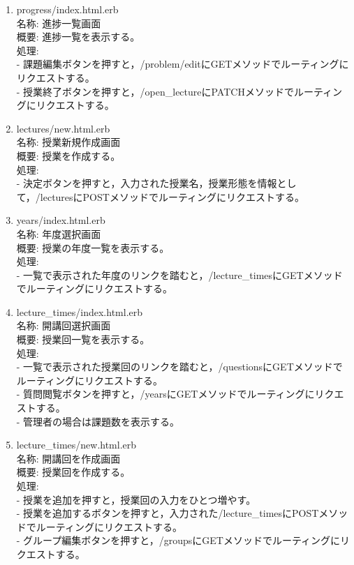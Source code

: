 \begin{enumerate}
\item progress/index.html.erb\\
名称:
進捗一覧画面\\
概要:
進捗一覧を表示する。\\
処理:\\
- 課題編集ボタンを押すと，/problem/editにGETメソッドでルーティングにリクエストする。\\
- 授業終了ボタンを押すと，/open\_lectureにPATCHメソッドでルーティングにリクエストする。

\item lectures/new.html.erb\\
名称:
授業新規作成画面\\
概要:
授業を作成する。\\
処理:\\
- 決定ボタンを押すと，入力された授業名，授業形態を情報として，/lecturesにPOSTメソッドでルーティングにリクエストする。

\item years/index.html.erb\\
名称:
年度選択画面\\
概要:
授業の年度一覧を表示する。\\
処理:\\
- 一覧で表示された年度のリンクを踏むと，/lecture\_timesにGETメソッドでルーティングにリクエストする。

\item lecture\_times/index.html.erb\\
名称:
開講回選択画面\\
概要:
授業回一覧を表示する。\\
処理:\\
- 一覧で表示された授業回のリンクを踏むと，/questionsにGETメソッドでルーティングにリクエストする。\\
- 質問閲覧ボタンを押すと，/yearsにGETメソッドでルーティングにリクエストする。\\
- 管理者の場合は課題数を表示する。

\item lecture\_times/new.html.erb\\
名称:
開講回を作成画面\\
概要:
授業回を作成する。\\
処理:\\
- 授業を追加を押すと，授業回の入力をひとつ増やす。\\
- 授業を追加するボタンを押すと，入力された/lecture\_timesにPOSTメソッドでルーティングにリクエストする。\\
- グループ編集ボタンを押すと，/groupsにGETメソッドでルーティングにリクエストする。


\end{enumerate}

